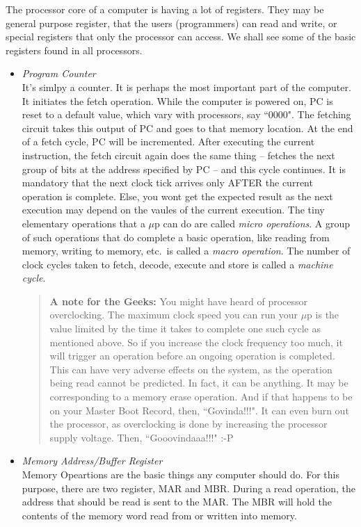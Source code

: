 \documentclass{book}
\begin{document}
The processor core of a computer is having a lot of registers. They may be
general purpose register, that the users (programmers) can read and write, or special registers
that only the processor can access. We shall see some of the basic registers
found in all processors.
\begin{itemize}
  \item \textit{Program Counter} \\[5pt]
    It\rq s simlpy a counter. It is perhaps the most important part of the
computer. It initiates the fetch operation. While the computer is powered on, PC
is reset to a default value, which vary with processors, say ``0000". The fetching circuit takes this output of PC
and goes to that memory location. At the end of a fetch cycle, PC will be incremented. After executing the current instruction, the fetch circuit again
does the same thing  -- fetches the next group of bits at the address specified by PC -- and this cycle continues. It is mandatory that the next
clock tick arrives only AFTER the current operation is complete. Else, you wont get
the expected result as the next execution may depend on the vaules of the
current execution. The tiny elementary operations that a $\mu$p can do are
called \emph{micro operations}. A group of such operations that do complete a basic operation, like reading from memory, writing to memory, etc.\ is called a \emph{macro operation}. The number of clock cycles taken to fetch, decode, execute and store is called a \emph{machine cycle}.
    \begin{quote}
    \textbf{A note for the Geeks:} You might have heard of processor overclocking. The maximum clock speed you can run your $\mu$p is the value limited by the
time it takes to complete one such cycle as mentioned above. So if you increase
the clock frequency too much, it will trigger an operation before an ongoing
operation is completed. This can have very adverse effects on the system, as the
operation being read cannot be predicted. In fact, it can be anything. It
may be corresponding to a memory erase operation. And if that happens to be on your
Master Boot Record, then, ``Govinda!!!". It can even burn out the processor, as overclocking is done by increasing the processor supply voltage. Then, ``Gooovindaaa!!!" :-P
    \end{quote}
  \item \textit{Memory Address/Buffer Register} \\[5pt]
    Memory Opeartions are the basic things any computer should do. For this
purpose, there are two register, MAR and MBR. During a read operation, the
address that should be read is sent to the MAR. The MBR will hold the contents
of the memory word read from or written into memory.


\end{itemize}
\end{document}
